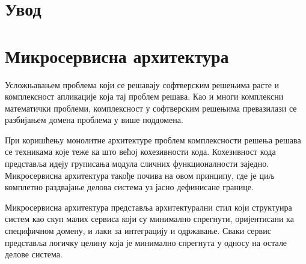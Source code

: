 \documentclass[12pt,oneside]{memoir}
\begin{document}
\frontmatter
\naslovna
\komisija
\apstrakt
\tableofcontents*

\mainmatter

\chapter{Увод}



\chapter{Микросервисна архитектура}
\label{chp:mikroservisi}

Усложњавањем проблема који се решавају софтверским решењима расте и комплексност апликације која тај проблем решава. Као и многи комплексни математички проблеми, комплексност у софтверским решењима превазилази се разбијањем домена проблема у више поддомена. 

При коришћењу монолитне архитектуре проблем комплексности решења решава се техникама које теже ка што већој кохезивности кода. Кохезивност кода представља идеју груписања модула сличних функционалности заједно. 
Микросервисна архитектура такође почива на овом принципу, где је циљ комплетно раздвајање делова система уз јасно дефинисане границе. 

Микросервисна архитектура представља архитектурални стил који структуира систем као скуп малих сервиса који су минимално спрегнути, оријентисани ка специфичном домену, и лаки за интеграцију и одржавање. Сваки сервис представља логичку целину која је минимално спрегнута у односу на остале делове система.
\end{document}
